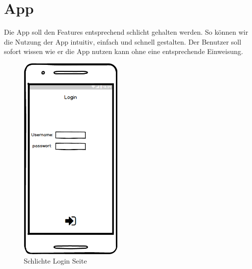 \section{App}
Die App soll den Features entsprechend schlicht gehalten werden.
So können wir die Nutzung der App intuitiv, einfach und schnell gestalten.
Der Benutzer soll sofort wissen wie er die App nutzen kann ohne eine entsprechende Einweisung.

\begin{figure}[ht]
	\centering
	\includegraphics[keepaspectratio,width=5cm]{img/Login}
	\caption{Schlichte Login Seite}
	\label{fig:App1}
\end{figure}

